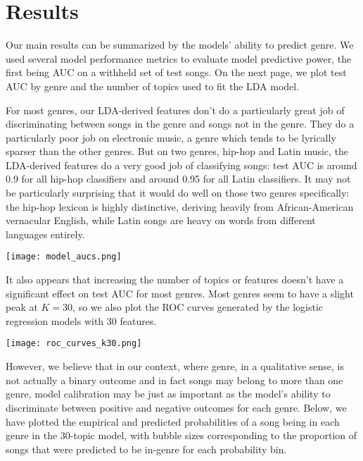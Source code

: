 \documentclass[12pt, titlepage]{article}
\begin{document}
\section{Results}
Our main results can be summarized by the models' ability to predict genre. We used several model performance metrics to evaluate model predictive power, the first being AUC on a withheld set of test songs. On the next page, we plot test AUC by genre and the number of topics used to fit the LDA model.

For most genres, our LDA-derived features don't do a particularly great job of discriminating between songs in the genre and songs not in the genre. They do a particularly poor job on electronic music, a genre which tends to be lyrically sparser than the other genres. But on two genres, hip-hop and Latin music, the LDA-derived features do a very good job of classifying songs: test AUC is around 0.9 for all hip-hop classifiers and around 0.95 for all Latin classifiers. It may not be particularly surprising that it would do well on those two genres specifically: the hip-hop lexicon is highly distinctive, deriving heavily from African-American vernacular English, while Latin songs are heavy on words from different languages entirely. 

\begin{center}
    \texttt{[image: model\_aucs.png]}
\end{center}

It also appears that increasing the number of topics or features doesn't have a significant effect on test AUC for most genres. Most genres seem to have a slight peak at $K=30$, so we also plot the ROC curves generated by the logistic regression models with 30 features.

\begin{center}
    \texttt{[image: roc\_curves\_k30.png]}
\end{center}

However, we believe that in our context, where genre, in a qualitative sense, is not actually a binary outcome and in fact songs may belong to more than one genre, model calibration may be just as important as the model's ability to discriminate between positive and negative outcomes for each genre. Below, we have plotted the empirical and predicted probabilities of a song being in each genre in the 30-topic model, with bubble sizes corresponding to the proportion of songs that were predicted to be in-genre for each probability bin. 
\end{document}
